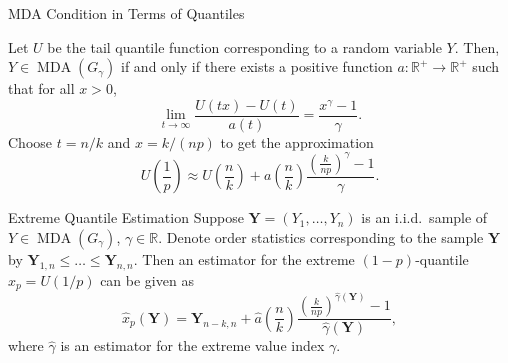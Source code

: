 \documentclass{beamer}
\DeclareMathOperator{\mda}{MDA}
\begin{document}

\begin{frame}{MDA Condition in Terms of Quantiles \parencite{dehaan1984}}
  
  Let $U$ be the tail quantile function corresponding to a random variable $Y$.
  Then, $Y\in\mda\left(G_\gamma\right)$ if and only if there exists a positive
  function $a:\mathbb{R}^+ \to \mathbb{R}^+$ such that for all $x > 0$,
  \begin{equation*}
    \lim_{t\to\infty}\frac{U\left(tx\right) - U\left(t\right)}
    {a\left(t\right)} = \frac{x^\gamma - 1}{\gamma}.
  \end{equation*}
  \pause
  Choose $t=n/k$ and $x = k/(np)$ to get the approximation
    \begin{equation*}
      U\left(\frac{1}{p}\right)\approx U\left(\frac{n}{k}\right) +
      a\left(\frac{n}{k}\right)
      \frac{\left(\frac{k}{np}\right)^{\gamma} - 1}{\gamma}.
    \end{equation*}
\end{frame}


\begin{frame}{Extreme Quantile Estimation}
  Suppose $\bm Y = \left(Y_1, \ldots, Y_n\right)$ is an i.i.d.\ sample of
  $Y\in\mda\left(G_\gamma\right)$, $\gamma\in\mathbb{R}$. Denote order
  statistics corresponding to the sample $\bm Y$ by $\bm Y_{1, n} \leq \dots
  \leq \bm Y_{n, n}$. Then an estimator for the extreme $(1-p)$-quantile $x_{p}
  = U\left(1/p\right)$ can be given as
  \begin{equation*}
    \hat x_{p}\left(\bm Y\right) = \bm Y_{n-k,n} +
    \hat{a}\left(\frac{n}{k}\right)
    \frac{\left(\frac{k}{np}\right)^{\hat\gamma\left(\bm Y\right)} - 1}
    {\hat\gamma\left(\bm Y\right)},
  \end{equation*}
  where $\hat\gamma$ is an estimator for the extreme value index $\gamma$.
\end{frame}

\end{document}
